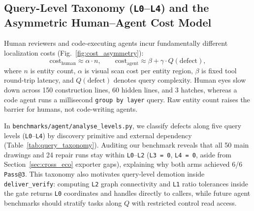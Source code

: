 \documentclass[nocopyright,nolists,upint,varvw,hyphenate]{asmejour}
\begin{document}
\subsection{Query-Level Taxonomy (\texttt{L0}--\texttt{L4}) and the Asymmetric Human--Agent Cost Model}\label{sec:query_taxonomy}

Human reviewers and code-executing agents incur fundamentally different localization costs (Fig.~\ref{fig:cost_asymmetry}):
\begin{equation}\label{eqn:cost_model}
\mathrm{cost}_{\mathrm{human}} \approx \alpha \cdot n,
\qquad
\mathrm{cost}_{\mathrm{agent}} \approx \beta + \gamma \cdot Q(\mathrm{defect}),
\end{equation}
where $n$ is entity count, $\alpha$ is visual scan cost per entity region, $\beta$ is fixed tool round-trip latency, and $Q(\mathrm{defect})$ denotes query complexity. Human eyes slow down across 150 construction lines, 60 hidden lines, and 3 hatches, whereas a code agent runs a millisecond \texttt{group by layer} query. Raw entity count raises the barrier for humans, not code-writing agents.

In \texttt{benchmarks/agent/analyse\_levels.py}, we classify defects along five query levels (\texttt{L0}--\texttt{L4}) by discovery primitive and external dependency (Table~\ref{tab:query_taxonomy}). Auditing our benchmark reveals that all 50 main drawings and 24 repair runs stay within \texttt{L0}--\texttt{L2} (\texttt{L3 = 0}, \texttt{L4 = 0}, aside from Section~\ref{sec:cross_eco} exporter gaps), explaining why both arms achieved 6/6 \texttt{Pass@3}. This taxonomy also motivates query-level demotion inside \texttt{deliver\_verify}: computing \texttt{L2} graph connectivity and \texttt{L1} ratio tolerances inside the gate returns \texttt{L0} coordinates and handles directly to callers, while future agent benchmarks should stratify tasks along $Q$ with restricted control read access.
\end{document}
